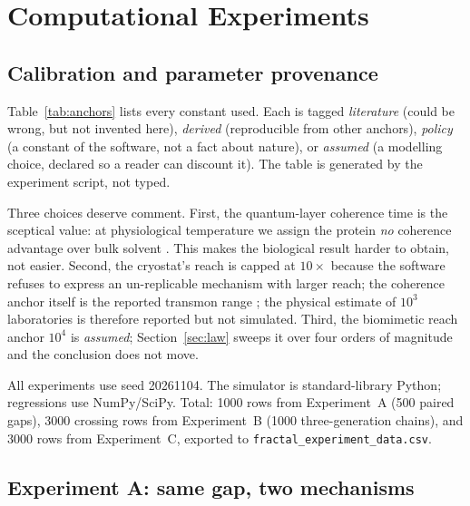 \documentclass[conference]{IEEEtran}
\theoremstyle{definition}
\begin{document}
\section{Computational Experiments}
\label{sec:exp}

\subsection{Calibration and parameter provenance}

Table~\ref{tab:anchors} lists every constant used. Each is tagged
\emph{literature} (could be wrong, but not invented here), \emph{derived}
(reproducible from other anchors), \emph{policy} (a constant of the software, not a
fact about nature), or \emph{assumed} (a modelling choice, declared so a reader can
discount it). The table is generated by the experiment script, not typed.

\begin{table}[t]
\centering
\caption{Parameters and provenance. Generated from the anchor table in
\texttt{parameters.py}.}
\label{tab:anchors}
\footnotesize
\resizebox{\columnwidth}{!}{}
\end{table}

Three choices deserve comment. First, the quantum-layer coherence time is the
sceptical value: at physiological temperature we assign the protein \emph{no}
coherence advantage over bulk solvent \cite{duan2017}. This makes the biological
result harder to obtain, not easier. Second, the cryostat's reach is capped at
$10\times$ because the software refuses to express an un-replicable mechanism with
larger reach; the coherence anchor itself is the reported transmon range
\cite{kjaergaard2020}; the physical estimate of $10^{3}$ laboratories is therefore reported
but not simulated. Third, the biomimetic reach anchor $10^{4}$ is
\emph{assumed}; Section~\ref{sec:law} sweeps it over four orders of magnitude and
the conclusion does not move.

All experiments use seed \num{20261104}. The simulator is standard-library Python;
regressions use NumPy/SciPy. Total: \num{1000} rows from Experiment~A (500 paired
gaps), \num{3000} crossing rows from Experiment~B (1000 three-generation chains),
and \num{3000} rows from Experiment~C, exported to
\texttt{fractal\_experiment\_data.csv}.

\subsection{Experiment A: same gap, two mechanisms}
\end{document}
